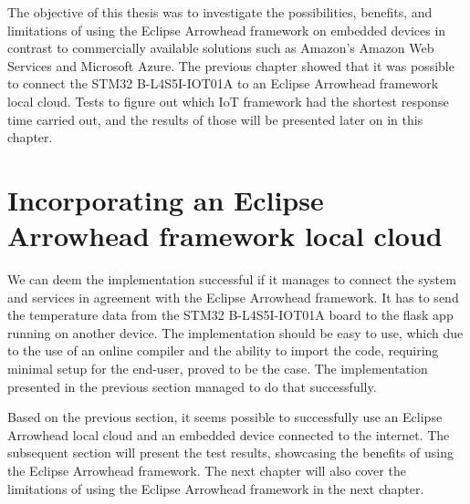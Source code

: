 The objective of this thesis was to investigate the possibilities, benefits, and limitations of using the Eclipse Arrowhead framework on embedded devices in contrast to commercially available solutions such
as Amazon's Amazon Web Services and Microsoft Azure. 
The previous chapter showed that it was possible to connect the STM32 B-L4S5I-IOT01A to an Eclipse Arrowhead framework local cloud.
Tests to figure out which IoT framework had the shortest response time carried out, and the results of those will be presented later on in this chapter.

\section{Incorporating an Eclipse Arrowhead framework local cloud}
We can deem the implementation successful if it manages to connect the system and services in agreement with the Eclipse Arrowhead framework.
It has to send the temperature data from the STM32 B-L4S5I-IOT01A board to the flask app running on another device.
The implementation should be easy to use, which due to the use of an online compiler and the ability to import the code, requiring minimal setup for the end-user, proved to be the case.  
The implementation presented in the previous section managed to do that successfully.

Based on the previous section, it seems possible to successfully use an Eclipse Arrowhead local cloud and an embedded device connected to the internet. 
The subsequent section will present the test results, showcasing the benefits of using the Eclipse Arrowhead framework.
The next chapter will also cover the limitations of using the Eclipse Arrowhead framework in the next chapter.

